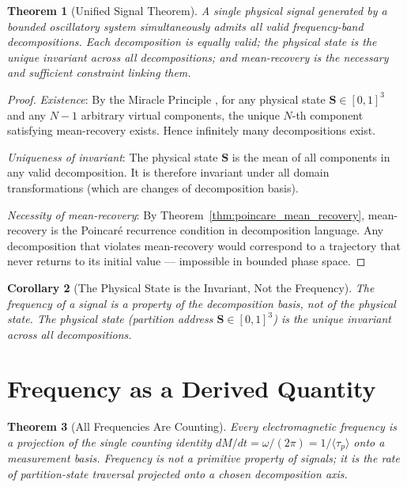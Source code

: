 \documentclass[twocolumn,10pt,a4paper]{article}
\theoremstyle{thmstyle}
\newtheorem{theorem}{Theorem}[section]
\newtheorem{corollary}[theorem]{Corollary}
\theoremstyle{definition}
\theoremstyle{remark}
\newcommand{\Sv}{\mathbf{S}}
\begin{document}
\begin{theorem}[Unified Signal Theorem]
\label{thm:unified_signal}
A single physical signal generated by a bounded oscillatory system
simultaneously admits all valid frequency-band decompositions.
Each decomposition is equally valid; the physical state is the unique
invariant across all decompositions; and mean-recovery is the necessary
and sufficient constraint linking them.
\end{theorem}

\begin{proof}
\emph{Existence}: By the Miracle Principle \citep{companion:trajectory},
for any physical state $\Sv \in [0,1]^3$ and any $N-1$ arbitrary virtual
components, the unique $N$-th component satisfying mean-recovery exists.
Hence infinitely many decompositions exist.

\emph{Uniqueness of invariant}: The physical state $\Sv$ is the mean of
all components in any valid decomposition.  It is therefore invariant under
all domain transformations (which are changes of decomposition basis).

\emph{Necessity of mean-recovery}: By Theorem~\ref{thm:poincare_mean_recovery},
mean-recovery is the Poincar\'e recurrence condition in decomposition language.
Any decomposition that violates mean-recovery would correspond to a trajectory
that never returns to its initial value --- impossible in bounded phase space.
\end{proof}

\begin{corollary}[The Physical State is the Invariant, Not the Frequency]
The frequency of a signal is a property of the decomposition basis, not
of the physical state.  The physical state (partition address $\Sv \in [0,1]^3$)
is the unique invariant across all decompositions.
\end{corollary}

\section{Frequency as a Derived Quantity}
\label{sec:frequency}

\begin{theorem}[All Frequencies Are Counting]
\label{thm:frequency_derived}
Every electromagnetic frequency is a projection of the single counting
identity $dM/dt = \omega/(2\pi) = 1/\langle\tau_p\rangle$ onto a
measurement basis.  Frequency is not a primitive property of signals;
it is the rate of partition-state traversal projected onto a chosen
decomposition axis.
\end{theorem}
\end{document}
